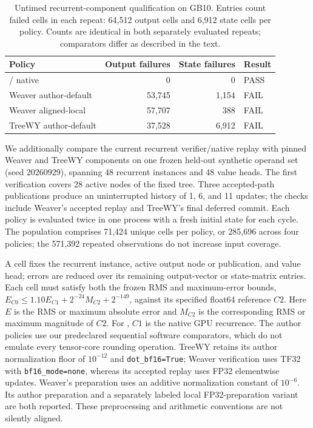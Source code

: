 \begin{table}[t]
\centering
\caption{Untimed recurrent-component qualification on GB10. Entries count failed cells in each repeat: 64,512 output cells and 6,912 state cells per policy. Counts are identical in both separately evaluated repeats; comparators differ as described in the text.}
\label{tab:m1-qualification}
\small
\setlength{\tabcolsep}{3pt}
\begin{tabular}{@{}lrrl@{}}
\toprule
Policy & Output failures & State failures & Result \\
\midrule
\sys{} / native & 0 & 0 & PASS \\
Weaver author-default & 53,745 & 1,154 & FAIL \\
Weaver aligned-local & 57,707 & 388 & FAIL \\
TreeWY author-default & 37,528 & 6,912 & FAIL \\
\bottomrule
\end{tabular}
\end{table}

We additionally compare the current recurrent verifier/native replay with pinned Weaver and TreeWY components on one frozen held-out synthetic operand set (seed 20260929), spanning 48 recurrent instances and 48 value heads. The first verification covers 28 active nodes of the fixed tree. Three accepted-path publications produce an uninterrupted history of 1, 6, and 11 updates; the checks include Weaver's accepted replay and TreeWY's final deferred commit. Each policy is evaluated twice in one process with a fresh initial state for each cycle. The population comprises 71,424 unique cells per policy, or 285,696 across four policies; the 571,392 repeated observations do not increase input coverage.

A cell fixes the recurrent instance, active output node or publication, and value head; errors are reduced over its remaining output-vector or state-matrix entries. Each cell must satisfy both the frozen RMS and maximum-error bounds, $E_{C0}\leq 1.10E_{C1}+2^{-24}M_{C2}+2^{-149}$, against its specified float64 reference $C2$. Here $E$ is the RMS or maximum absolute error and $M_{C2}$ is the corresponding RMS or maximum magnitude of $C2$. For \sys{}, $C1$ is the native GPU recurrence. The author policies use our predeclared sequential software comparators, which do not emulate every tensor-core rounding operation. TreeWY retains its author normalization floor of $10^{-12}$ and \texttt{dot\_bf16=True}; Weaver verification uses TF32 with \texttt{bf16\_mode=none}, whereas its accepted replay uses FP32 elementwise updates. Weaver's preparation uses an additive normalization constant of $10^{-6}$. Its author preparation and a separately labeled local FP32-preparation variant are both reported. These preprocessing and arithmetic conventions are not silently aligned.

